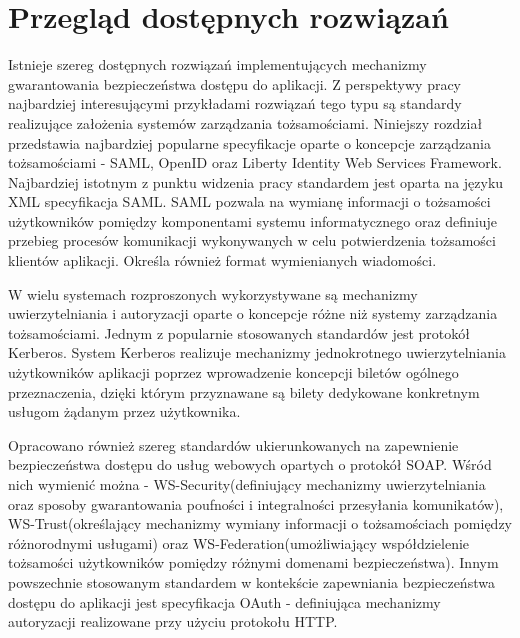\chapter{Przegląd dostępnych rozwiązań}
\label{cha:przegladRozwiazan}

{\it

	Istnieje szereg dostępnych rozwiązań implementujących mechanizmy gwarantowania bezpieczeństwa dostępu do aplikacji. Z perspektywy pracy najbardziej interesującymi przykładami rozwiązań tego typu są standardy realizujące założenia systemów zarządzania tożsamościami. Niniejszy rozdział przedstawia najbardziej popularne specyfikacje oparte o koncepcje zarządzania tożsamościami - SAML, OpenID oraz Liberty Identity Web Services Framework. Najbardziej istotnym z punktu widzenia pracy standardem jest oparta na języku XML specyfikacja SAML. SAML pozwala na wymianę informacji o tożsamości użytkowników pomiędzy komponentami systemu informatycznego oraz definiuje przebieg procesów komunikacji wykonywanych w celu potwierdzenia tożsamości klientów aplikacji. Określa również format wymienianych wiadomości. 

	W wielu systemach rozproszonych wykorzystywane są mechanizmy uwierzytelniania i autoryzacji oparte o koncepcje różne niż systemy zarządzania tożsamościami. Jednym z popularnie stosowanych standardów jest protokół Kerberos. System Kerberos realizuje mechanizmy jednokrotnego uwierzytelniania użytkowników aplikacji poprzez wprowadzenie koncepcji biletów ogólnego przeznaczenia, dzięki którym przyznawane są bilety dedykowane konkretnym usługom żądanym przez użytkownika.

	Opracowano również szereg standardów ukierunkowanych na zapewnienie bezpieczeństwa dostępu do usług webowych opartych o protokół SOAP. Wśród nich wymienić można - WS-Security(definiujący mechanizmy uwierzytelniania oraz sposoby gwarantowania poufności i integralności przesyłania komunikatów), WS-Trust(określający mechanizmy wymiany informacji o tożsamościach pomiędzy różnorodnymi usługami) oraz WS-Federation(umożliwiający współdzielenie tożsamości użytkowników pomiędzy różnymi domenami bezpieczeństwa). Innym powszechnie stosowanym standardem w kontekście zapewniania bezpieczeństwa dostępu do aplikacji jest specyfikacja OAuth - definiująca mechanizmy autoryzacji realizowane przy użyciu protokołu HTTP. 

}


\label{sec:standardyIdM}

